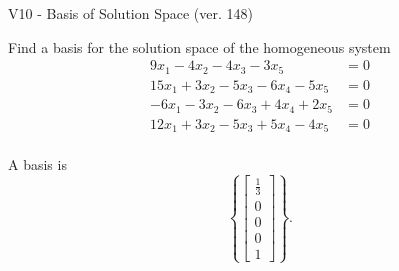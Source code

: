 \begin{exercise}
  \begin{exerciseTitle}V10 - Basis of Solution Space (ver. 148)\end{exerciseTitle}
  \begin{exerciseStatement}
    Find a basis for the solution space of the homogeneous system 
\begin{align*}
 9 x_ 1 -4 x_ 2 -4 x_ 3 -3 x_ 5 &= 0  \\ 
  15 x_ 1 + 3 x_ 2 -5 x_ 3 -6 x_ 4 -5 x_ 5 &= 0  \\ 
  -6 x_ 1 -3 x_ 2 -6 x_ 3 + 4 x_ 4 + 2 x_ 5 &= 0  \\ 
  12 x_ 1 + 3 x_ 2 -5 x_ 3 + 5 x_ 4 -4 x_ 5 &= 0  \\ 
 \end{align*}


 
  \end{exerciseStatement}

  \begin{exerciseAnswer}
   A basis is   
\[\left\{\left[\begin{array}{c}
\frac{1}{3} \\
0 \\
0 \\
0 \\
1
\end{array}\right]\right\}.\]

  


  \end{exerciseAnswer}
\end{exercise}